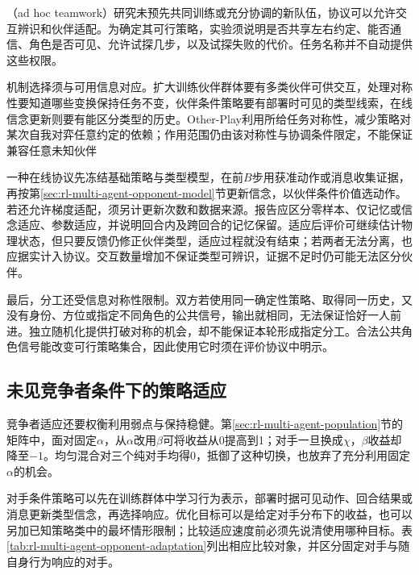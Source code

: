 （ad hoc teamwork）研究未预先共同训练或充分协调的新队伍，协议可以允许交互辨识和伙伴适配。为确定其可行策略，实验须说明是否共享左右约定、能否通信、角色是否可见、允许试探几步，以及试探失败的代价。任务名称并不自动提供这些权限。

机制选择须与可用信息对应。扩大训练伙伴群体要有多类伙伴可供交互，处理对称性要知道哪些变换保持任务不变，伙伴条件策略要有部署时可见的类型线索，在线信念更新则要有能区分类型的历史。Other-Play利用所给任务对称性，减少策略对某次自我对弈任意约定的依赖；作用范围仍由该对称性与协调条件限定，不能保证兼容任意未知伙伴

一种在线协议先冻结基础策略与类型模型，在前$B$步用获准动作或消息收集证据，再按第\ref{sec:rl-multi-agent-opponent-model}节更新信念，以伙伴条件价值选动作。若还允许梯度适配，须另计更新次数和数据来源。报告应区分零样本、仅记忆或信念适应、参数适应，并说明回合内及跨回合的记忆保留。适应后评价可继续估计物理状态，但只要反馈仍修正伙伴类型，适应过程就没有结束；若两者无法分离，也应据实计入协议。交互数量增加不保证类型可辨识，证据不足时仍可能无法区分伙伴。

最后，分工还受信息对称性限制。双方若使用同一确定性策略、取得同一历史，又没有身份、方位或指定不同角色的公共信号，输出就相同，无法保证恰好一人前进。独立随机化提供打破对称的机会，却不能保证本轮形成指定分工。合法公共角色信号能改变可行策略集合，因此使用它时须在评价协议中明示。

\subsection{未见竞争者条件下的策略适应}
\label{sec:rl-multi-agent-new-opponents}

竞争者适应还要权衡利用弱点与保持稳健。第\ref{sec:rl-multi-agent-population}节的矩阵中，面对固定$\alpha$，从$\alpha$改用$\beta$可将收益从0提高到1；对手一旦换成$\chi$，$\beta$收益却降至$-1$。均匀混合对三个纯对手均得0，抵御了这种切换，也放弃了充分利用固定$\alpha$的机会。

对手条件策略可以先在训练群体中学习行为表示，部署时据可见动作、回合结果或消息更新类型信念，再选择响应。优化目标可以是给定对手分布下的收益，也可以另加已知策略类中的最坏情形限制；比较适应速度前必须先说清使用哪种目标。表\ref{tab:rl-multi-agent-opponent-adaptation}列出相应比较对象，并区分固定对手与随自身行为响应的对手。

